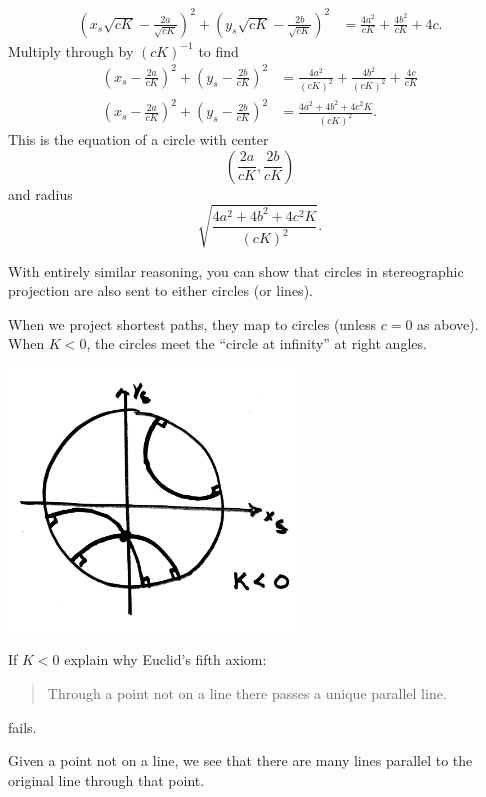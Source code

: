 \documentclass{ximera}
\begin{document}
\begin{problem}
\begin{freeResponse}
\begin{align*}
  \left(x_s\sqrt{cK} - \frac{2a}{\sqrt{cK}}\right)^2 + \left(y_s\sqrt{cK} - \frac{2b}{\sqrt{cK}}\right)^2&=\frac{4a^2}{cK} + \frac{4b^2}{cK} + 4c.
  \end{align*}
  Multiply through by $(cK)^{-1}$ to find
  \begin{align*}
    \left(x_s - \frac{2a}{cK}\right)^2 + \left(y_s - \frac{2b}{cK}\right)^2 &= \frac{4a^2}{(cK)^2} + \frac{4b^2}{(cK)^2} + \frac{4c}{cK}\\
    \left(x_s - \frac{2a}{cK}\right)^2 + \left(y_s - \frac{2b}{cK}\right)^2 &= \frac{4a^2 + 4b^2 + 4c^2K}{(cK)^2}.
  \end{align*}
  This is the equation of a circle with center
  \[
  \left(\frac{2a}{cK}, \frac{2b}{cK}\right)
  \]
  and radius
  \[
  \sqrt{\frac{4a^2 + 4b^2 + 4c^2K}{(cK)^2}}.
  \]
\end{freeResponse}
\end{problem}



\begin{remark}
  With entirely similar reasoning, you can show that circles in
  stereographic projection are also sent to either circles (or lines).
\end{remark}


When we project shortest paths, they map to circles (unless $c=0$ as
above). When $K<0$, the circles meet the ``circle at infinity'' at right angles. 

\begin{image}
\includegraphics[width=3in]{stereoLines.png}
\end{image}

\begin{problem}
  If $K<0$ explain why Euclid's fifth axiom:
  \begin{quote}
    Through a point not on a line there passes a unique parallel line.
  \end{quote}
  fails.
  \begin{freeResponse}
    Given a point not on a line, we see that there are many lines
    parallel to the original line through that point.
  \end{freeResponse}
\end{problem}
\end{document}
